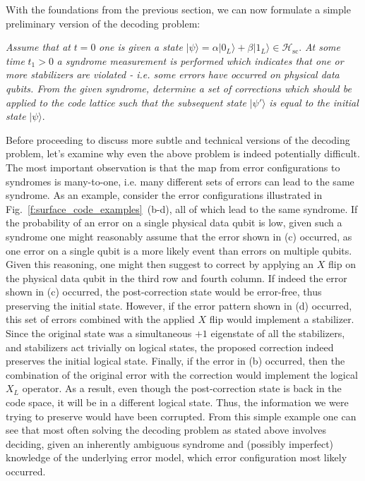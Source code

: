 \documentclass[twocolumn,preprintnumbers,amsmath,amssymb,notitlepage,nofootinbib,longbibliography,superscriptaddress,aps,pra,10pt]{revtex4-1}
\begin{document}
	With the foundations from the previous section, we can now formulate a simple preliminary version of the decoding problem: \newline

	\noindent\textit{Assume that at} $t=0$  \textit{one is given a state} $|\psi\rangle = \alpha |0_L\rangle + \beta |1_L\rangle \in \mathcal{H}_{\mathrm{sc}}.$ \textit{At some time }$t_1>0$ \textit{a syndrome measurement is performed which indicates that one or more stabilizers are violated - i.e. some errors have occurred on physical data qubits. From the given syndrome, determine a set of corrections which should be applied to the code lattice such that the subsequent state} $|\psi'\rangle$ \textit{is equal to the initial state} $|\psi\rangle.$ \newline

	\noindent Before proceeding to discuss more subtle and technical versions of the decoding problem, let's examine why even the above problem is indeed potentially difficult.
	The most important observation is that the map from error configurations to syndromes is many-to-one, i.e. many different sets of errors can lead to the same syndrome.
	As an example, consider the error configurations illustrated in Fig.~\ref{f:surface_code_examples}~(b-d), all of which lead to the same syndrome.
	If the probability of an error on a single physical data qubit is low, given such a syndrome one might reasonably assume that the error shown in (c) occurred, as one error on a single qubit is a more likely event than errors on multiple qubits.
	Given this reasoning, one might then suggest to correct by applying an $X$ flip on the physical data qubit in the third row and fourth column.
	If indeed the error shown in (c) occurred, the post-correction state would be error-free, thus preserving the initial state.
	However, if the error pattern shown in (d) occurred, this set of errors combined with the applied $X$ flip would implement a stabilizer.
	Since the original state was a simultaneous $+1$ eigenstate of all the stabilizers, and stabilizers act trivially on logical states, the proposed correction indeed preserves the initial logical state.
	Finally, if the error in (b) occurred, then the combination of the original error with the correction would implement the logical $X_L$ operator.
	As a result, even though the post-correction state is back in the code space, it will be in a different logical state.
	Thus, the information we were trying to preserve would have been corrupted.
	From this simple example one can see that most often solving the decoding problem as stated above involves deciding, given an inherently ambiguous syndrome and (possibly imperfect) knowledge of the underlying error model, which error configuration most likely occurred.
\end{document}
